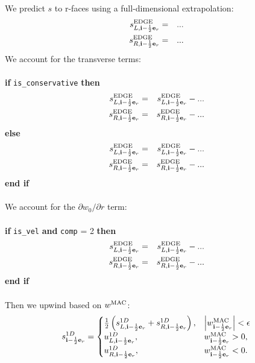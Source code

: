 We predict $s$ to r-faces using a full-dimensional extrapolation:
\begin{eqnarray}
s_{L,{\bf i}-\frac{1}{2}{\bf e}_r}^{\rm EDGE} &=& ...\\
s_{R,{\bf i}-\frac{1}{2}{\bf e}_r}^{\rm EDGE} &=& ...
\end{eqnarray}
We account for the transverse terms:\\ \\
{\bf if} {\tt is\_conservative} {\bf then}
\begin{eqnarray}
s_{L,{\bf i}-\frac{1}{2}{\bf e}_r}^{\rm EDGE} &=& s_{L,{\bf i}-\frac{1}{2}{\bf e}_r}^{\rm EDGE} - ...\\
s_{R,{\bf i}-\frac{1}{2}{\bf e}_r}^{\rm EDGE} &=& s_{R,{\bf i}-\frac{1}{2}{\bf e}_r}^{\rm EDGE} - ...
\end{eqnarray}
{\bf else}
\begin{eqnarray}
s_{L,{\bf i}-\frac{1}{2}{\bf e}_r}^{\rm EDGE} &=& s_{L,{\bf i}-\frac{1}{2}{\bf e}_r}^{\rm EDGE} - ...\\
s_{R,{\bf i}-\frac{1}{2}{\bf e}_r}^{\rm EDGE} &=& s_{R,{\bf i}-\frac{1}{2}{\bf e}_r}^{\rm EDGE} - ...
\end{eqnarray}
{\bf end if}\\ \\
We account for the $\partial w_0/\partial r$ term:\\ \\
{\bf if} {\tt is\_vel} {\bf and} {\tt comp} = 2 {\bf then}
\begin{eqnarray}
s_{L,{\bf i}-\frac{1}{2}{\bf e}_r}^{\rm EDGE} &=& s_{L,{\bf i}-\frac{1}{2}{\bf e}_r}^{\rm EDGE} - ...\\
s_{R,{\bf i}-\frac{1}{2}{\bf e}_r}^{\rm EDGE} &=& s_{R,{\bf i}-\frac{1}{2}{\bf e}_r}^{\rm EDGE} - ...
\end{eqnarray}
{\bf end if}\\ \\
Then we upwind based on $w^{\rm MAC}$:
\begin{equation}
s_{{\bf i}-\frac{1}{2}{\bf e}_r}^{1D} =
\begin{cases}
\frac{1}{2}\left(s_{L,{\bf i}-\frac{1}{2}{\bf e}_r}^{1D} + s_{R,{\bf i}-\frac{1}{2}{\bf e}_r}^{1D}\right), & \left|w^{\rm MAC}_{{\bf i}-\frac{1}{2}{\bf e}_r}\right| < \epsilon \\
u_{L,{\bf i}-\frac{1}{2}{\bf e}_r}^{1D}, & w^{\rm MAC}_{{\bf i}-\frac{1}{2}{\bf e}_r} > 0, \\
u_{R,{\bf i}-\frac{1}{2}{\bf e}_r}^{1D}, & w^{\rm MAC}_{{\bf i}-\frac{1}{2}{\bf e}_r} < 0. \\
\end{cases}
\end{equation}


